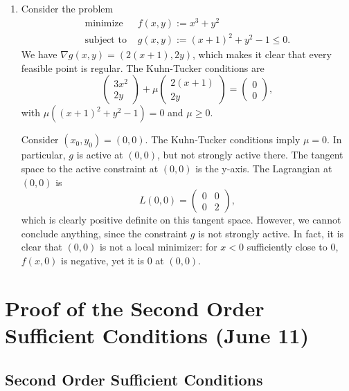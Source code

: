 \documentclass[11pt]{article}
\begin{document}
\begin{enumerate}
\item
Consider the problem
\begin{align*}
\text{minimize } &f(x,y) := x^3 + y^2 \\
\text{subject to } &g(x,y) := (x+1)^2 + y^2 - 1 \leq 0.
\end{align*}
We have $\nabla g(x,y) = (2(x+1), 2y)$, which makes it clear that every feasible point is regular. The Kuhn-Tucker conditions are
\[
\begin{pmatrix}
3x^2 \\ 2y
\end{pmatrix} + \mu \begin{pmatrix}
2(x+1) \\ 2y
\end{pmatrix} = \begin{pmatrix}
0 \\ 0
\end{pmatrix},
\]
with $\mu((x+1)^2 + y^2 - 1) = 0$ and $\mu \geq 0$.

Consider $(x_0, y_0) = (0,0)$. The Kuhn-Tucker conditions imply $\mu = 0$. In particular, $g$ is active at $(0,0)$, but not strongly active there. The tangent space to the active constraint at $(0,0)$ is the y-axis. The Lagrangian at $(0,0)$ is
\[
L(0,0) = \begin{pmatrix}
0 & 0 \\ 0 & 2
\end{pmatrix},
\]
which is clearly positive definite on this tangent space. However, we cannot conclude anything, since the constraint $g$ is not strongly active. In fact, it is clear that $(0,0)$ is not a local minimizer: for $x<0$ sufficiently close to $0$, $f(x,0)$ is negative, yet it is $0$ at $(0,0)$.
\end{enumerate}

\newpage

\section{Proof of the Second Order Sufficient Conditions (June 11)}

\subsection{Second Order Sufficient Conditions}
\end{document}
